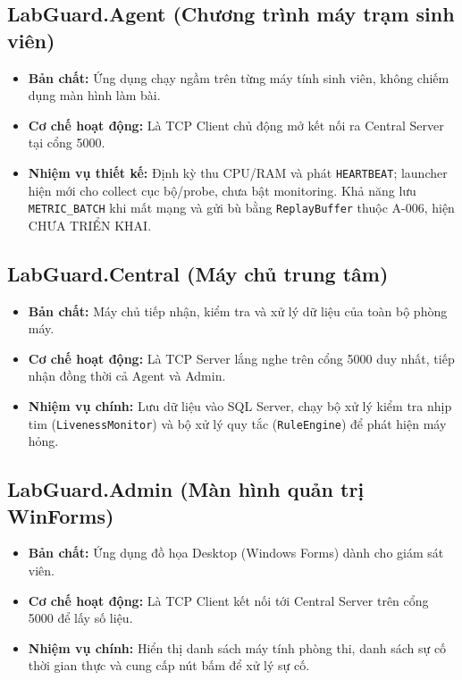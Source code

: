 \documentclass[12pt,a4paper]{article}
\begin{document}
\subsection{LabGuard.Agent (Chương trình máy trạm sinh viên)}
\begin{itemize}
  \item \textbf{Bản chất:} Ứng dụng chạy ngầm trên từng máy tính sinh viên, không chiếm dụng màn hình làm bài.
  \item \textbf{Cơ chế hoạt động:} Là TCP Client chủ động mở kết nối ra Central Server tại cổng 5000.
  \item \textbf{Nhiệm vụ thiết kế:} Định kỳ thu CPU/RAM và phát \texttt{HEARTBEAT}; launcher hiện mới cho collect cục bộ/probe, chưa bật monitoring. Khả năng lưu \texttt{METRIC\_BATCH} khi mất mạng và gửi bù bằng \texttt{ReplayBuffer} thuộc A-006, hiện CHƯA TRIỂN KHAI.
\end{itemize}

\subsection{LabGuard.Central (Máy chủ trung tâm)}
\begin{itemize}
  \item \textbf{Bản chất:} Máy chủ tiếp nhận, kiểm tra và xử lý dữ liệu của toàn bộ phòng máy.
  \item \textbf{Cơ chế hoạt động:} Là TCP Server lắng nghe trên cổng 5000 duy nhất, tiếp nhận đồng thời cả Agent và Admin.
  \item \textbf{Nhiệm vụ chính:} Lưu dữ liệu vào SQL Server, chạy bộ xử lý kiểm tra nhịp tim (\texttt{LivenessMonitor}) và bộ xử lý quy tắc (\texttt{RuleEngine}) để phát hiện máy hỏng.
\end{itemize}

\subsection{LabGuard.Admin (Màn hình quản trị WinForms)}
\begin{itemize}
  \item \textbf{Bản chất:} Ứng dụng đồ họa Desktop (Windows Forms) dành cho giám sát viên.
  \item \textbf{Cơ chế hoạt động:} Là TCP Client kết nối tới Central Server trên cổng 5000 để lấy số liệu.
  \item \textbf{Nhiệm vụ chính:} Hiển thị danh sách máy tính phòng thi, danh sách sự cố thời gian thực và cung cấp nút bấm để xử lý sự cố.
\end{itemize}
\end{document}
